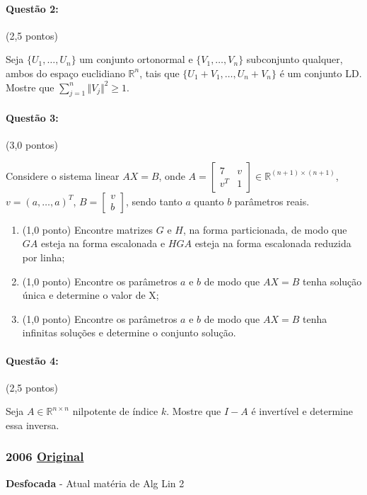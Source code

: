 \documentclass[12pt,a4paper]{article}
\newcommand{\norm}[1]{\Vert #1 \Vert}
\newcommand{\original}[1]{\tiny \href{#1}{Original} \normalsize}
\begin{document}
\paragraph{Questão 2:} (2,5 pontos)

Seja $\{U_1,\dots,U_n\}$ um conjunto ortonormal e $\{V_1,\dots,V_n\}$ subconjunto qualquer, ambos do espaço euclidiano $\mathbb{R}^n$, tais que $\{U_1+V_1,\dots,U_n+V_n\}$ é um conjunto LD. Mostre que $\sum_{j=1}^n \norm{V_j}^2 \geq 1$.

\paragraph{Questão 3:} (3,0 pontos)

Considere o sistema linear $AX=B$, onde $
A=\left[
\begin{array}{c|c}
7 & v \\
\hline
v^T & 1
\end{array}
\right]
\in \mathbb{R}^{(n+1)\times (n+1)}$,$v=(a,\dots,a)^T$, $
B=\left[
\begin{array}{cc}
v \\
\hline
b
\end{array}
\right]
$, sendo tanto $a$ quanto $b$ parâmetros reais.
\begin{enumerate}[label=(\alph*)]
\item (1,0 ponto) Encontre matrizes $G$ e $H$, na forma particionada, de modo que $GA$ esteja na forma escalonada e $HGA$ esteja na forma escalonada reduzida por linha;
\item (1,0 ponto) Encontre os parâmetros $a$ e $b$ de modo que $AX=B$ tenha solução única e determine o valor de X;
\item (1,0 ponto) Encontre os parâmetros $a$ e $b$ de modo que $AX=B$ tenha infinitas soluções e determine o conjunto solução.
\end{enumerate}
\paragraph{Questão 4:} (2,5 pontos)

Seja $A \in \mathbb{R}^{n\times n}$ nilpotente de índice $k$. Mostre que $I-A$ é invertível e determine essa inversa. 


\newpage
\subsubsection{2006 \original{https://drive.google.com/file/d/13f1ar5EX33BZ0PlEvSrW0Ce-etd_Yz31/view?usp=sharing}}
\textbf{Desfocada} - Atual matéria de Alg Lin 2
\end{document}
